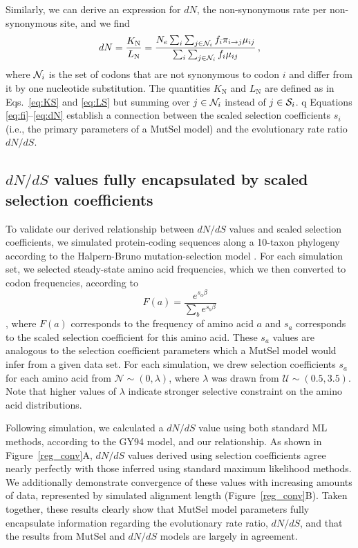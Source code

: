 \documentclass[11pt]{article}
\begin{document}
Similarly, we can derive an expression for $dN$, the non-synonymous rate per non-synonymous site, and we find
\begin{equation}\label{eq:dN}
  dN = \frac{K_\text{N}}{L_\text{N}}=\frac{ N_e \sum_i \sum_{j \in {\cal N}_i} f_i  \pi_{i\rightarrow j}\mu_{ij}}{\sum_i \sum_{j \in {\cal N}_i} f_i\mu_{ij}}\,,
\end{equation}
where ${\cal N}_i$ is the set of codons that are not synonymous to codon $i$ and differ from it by one nucleotide substitution. The quantities $K_\text{N}$ and $L_\text{N}$ are defined as in Eqs.~\eqref{eq:KS} and \eqref{eq:LS} but summing over $j\in {\cal N}_i$ instead of $j\in {\cal S}_i$. q
Equations \eqref{eq:fi}--\eqref{eq:dN} establish a connection between the scaled selection coefficients $s_i$ (i.e., the primary parameters of a MutSel model) and the evolutionary rate ratio $dN/dS$. 


\subsection*{$dN/dS$ values fully encapsulated by scaled selection coefficients}

To validate our derived relationship between $dN/dS$ values and scaled selection coefficients, we simulated protein-coding sequences along a 10-taxon phylogeny according to the Halpern-Bruno mutation-selection model \cite{HalpernBruno1998}. For each simulation set, we selected steady-state amino acid frequencies, which we then converted to codon frequencies, according to \begin{equation} F(a) = \frac{e^{s_a\beta}}{\sum_b e^{s_b\beta}} \end{equation}, where $F(a)$ corresponds to the frequency of amino acid $a$ and $s_a$ corresponds to the scaled selection coefficient for this amino acid. These $s_a$ values are analogous to the selection coefficient parameters which a MutSel model would infer from a given data set. For each simulation, we drew selection coefficients $s_a$ for each amino acid from $\mathcal{N} \sim (0, \lambda)$, where $\lambda$ was drawn from $\mathcal{U} \sim (0.5, 3.5)$. Note that higher values of $\lambda$ indicate stronger selective constraint on the amino acid distributions.

Following simulation, we calculated a $dN/dS$ value using both standard ML methods, according to the GY94 \cite{GoldmanYang1994} model, and our relationship. As shown in Figure~\ref{reg_conv}A, $dN/dS$ values derived using selection coefficients agree nearly perfectly with those inferred using standard maximum likelihood methods. We additionally demonstrate convergence of these values with increasing amounts of data, represented by simulated alignment length (Figure~\ref{reg_conv}B). Taken together, these results clearly show that MutSel model parameters fully encapsulate information regarding the evolutionary rate ratio, $dN/dS$, and that the results from MutSel and $dN/dS$ models are largely in agreement.
\end{document}
